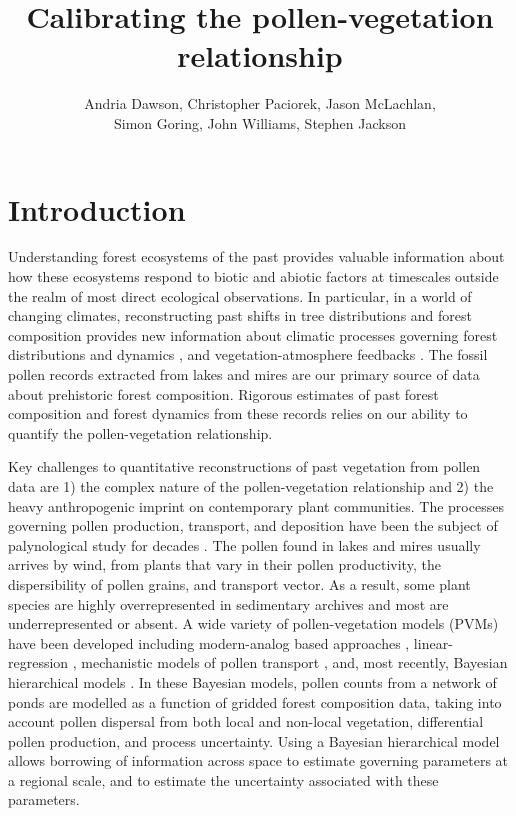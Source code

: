 \documentclass[12pt]{article}
\begin{document}
\nocite{*}

\title{Calibrating the pollen-vegetation relationship}

\author{Andria Dawson, Christopher Paciorek, Jason McLachlan,\\ Simon Goring, John Williams, Stephen Jackson}

\maketitle

\section{Introduction}

Understanding forest ecosystems of the past provides valuable
information about how these ecosystems respond to biotic and abiotic
factors at timescales outside the realm of most direct ecological
observations. In particular, in a world of changing climates,
reconstructing past shifts in tree distributions and forest
composition provides new information about climatic processes
governing forest distributions and dynamics \citep{goring2015a},
and vegetation-atmosphere feedbacks \citep{matthes2015}. The
fossil pollen records extracted from lakes and mires are our primary
source of data about prehistoric forest composition. Rigorous
estimates of past forest composition and forest dynamics from these
records relies on our ability to quantify the pollen-vegetation
relationship.

Key challenges to quantitative reconstructions of past vegetation from
pollen data are 1) the complex nature of the pollen-vegetation
relationship and 2) the heavy anthropogenic imprint on contemporary
plant communities.  The processes governing pollen production,
transport, and deposition have been the subject of palynological study
for decades \citep{tauber1965, jackson1994pollen, jackson1999pollen,
  sugita2007theory1, sugita2007theory2, prentice1988records}. The
pollen found in lakes and mires usually arrives by wind, from plants
that vary in their pollen productivity, the dispersibility of pollen
grains, and transport vector.  As a result, some plant species are
highly overrepresented in sedimentary archives and most are
underrepresented or absent.  A wide variety of pollen-vegetation
models (PVMs) have been developed including modern-analog based
approaches \citep{williams2003variations}, linear-regression
\citep{webb1981estimating}, mechanistic models of pollen transport
\citep{sugita2007theory1, sugita2007theory2, prentice1988records},
and, most recently, Bayesian hierarchical models
\citep{paciorek2009mapping, garreta2010method}. In these Bayesian
models, pollen counts from a network of ponds are modelled as a
function of gridded forest composition data, taking into account
pollen dispersal from both local and non-local vegetation,
differential pollen production, and process uncertainty. Using a
Bayesian hierarchical model allows borrowing of information across
space to estimate governing parameters at a regional scale, and to
estimate the uncertainty associated with these parameters.
\end{document}
